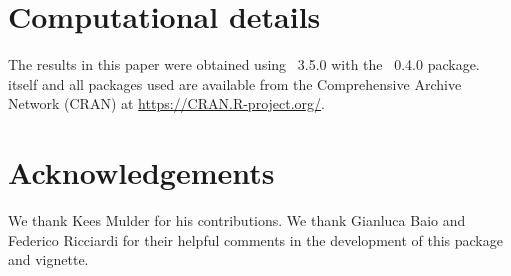 \documentclass[nojss]{jss}
\begin{document}
\section*{Computational details}

The results in this paper were obtained using
~3.5.0 with the
~0.4.0 package.  itself
and all packages used are available from the Comprehensive
 Archive Network (CRAN) at
\url{https://CRAN.R-project.org/}.


\section*{Acknowledgements}
We thank Kees Mulder for his contributions. We thank Gianluca Baio and Federico Ricciardi for their helpful comments in the development of this package and vignette.


\end{document}
